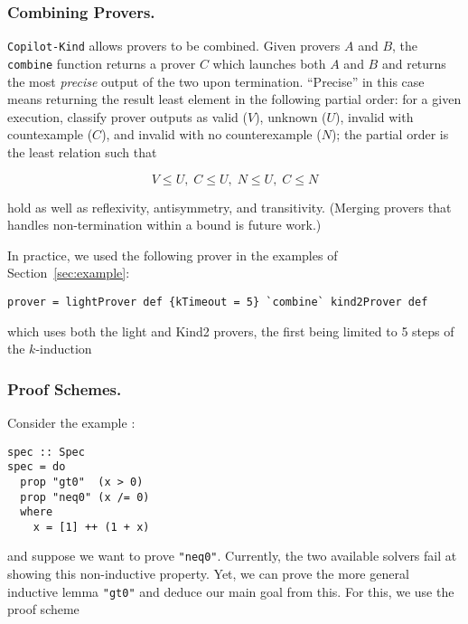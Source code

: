 %


\subsubsection{Combining Provers.}\label{combining-provers}
\texttt{Copilot-Kind} allows provers to be combined. Given provers $A$ and $B$,
the \texttt{combine} function returns a prover $C$ which launches both $A$ and
$B$ and returns the most \emph{precise} output of the two upon
termination. ``Precise'' in this case means returning the result least element
in the following partial order: for a given execution, classify prover outputs
as valid ($V$), unknown ($U$), invalid with countexample ($C$), and invalid with
no counterexample ($N$); the partial order is the least relation such that

$$V \leq U, \; C \leq U, \; N \leq U, \; C \leq N$$

\noindent
hold as well as reflexivity, antisymmetry, and transitivity. (Merging provers
that handles non-termination within a bound is future work.)

In practice, we used the following prover in the examples of Section~\ref{sec:example}:
\begin{lstlisting}[frame=single]
prover = lightProver def {kTimeout = 5} `combine` kind2Prover def
\end{lstlisting}
which uses both the light and Kind2 provers, the first being limited to 5 steps of the $k$-induction 

\subsubsection{Proof Schemes.}\label{proof-schemes}

Consider the example :
\begin{lstlisting}[frame=single]
spec :: Spec
spec = do
  prop "gt0"  (x > 0)
  prop "neq0" (x /= 0)
  where
    x = [1] ++ (1 + x)

\end{lstlisting}
and suppose we want to prove \texttt{"neq0"}. Currently, the two available solvers fail at showing this non-inductive property. Yet, we can prove the more general
inductive lemma \texttt{"gt0"} and deduce our main goal from this. For
this, we use the proof scheme

